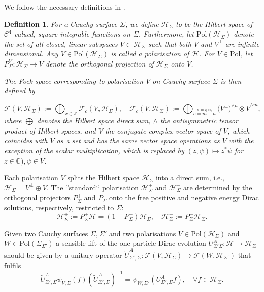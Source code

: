 \documentclass[a4paper,11pt]{article}
\newtheorem{de}{Definition}
\begin{document}
We follow the necessary definitions in \cite{ivp2}.
\begin{de}
For a Cauchy surface \(\Sigma\), we define \(\mathcal{H}_\Sigma\) to be the Hilbert space of \(\mathcal{C}^4\) valued, square integrable functions on \(\Sigma\).
Furthermore, let \(\mathrm{Pol}(\mathcal{H}_\Sigma)\) denote the set of all closed, linear subspaces \(V\subset \mathcal{H}_\Sigma\) such that both
\(V\) and \(V^\perp\) are infinite dimensional. Any \(V\in \mathrm{Pol}(\mathcal{H}_\Sigma)\) is called a polarisation of \(\mathcal{H}\). For \(V\in \mathrm{Pol}\),
let \(P^V_\Sigma:\mathcal{H}_\Sigma\rightarrow V\) denote the orthogonal projection of \(\mathcal{H}_\Sigma\) onto \(V\).

The Fock space corresponding to polarisation \(V\) on Cauchy surface \(\Sigma\) is then defined by 

\begin{equation}
\mathcal{F}(V,\mathcal{H}_\Sigma):=\bigoplus_{c\in\mathbb{Z}}\mathcal{F}_c(V,\mathcal{H}_\Sigma), \quad 
\mathcal{F}_c(V,\mathcal{H}_\Sigma):=\bigoplus_{\overset{n,m\in\mathbb{N}_0}{c=m-n}} \big( V^\perp\big)^{\wedge n} \otimes {\overline{V}}^{\wedge m},
\end{equation}
where \(\bigoplus\) denotes the Hilbert space direct sum, \(\wedge\) the antisymmetric tensor product of Hilbert spaces, and \(\overline{V}\) the conjugate complex vector
space of \(V\), which coincides with \(V\) as a set and has the same vector space operations as \(V\) with the exception of the scalar multiplication, which is 
replaced by \((z,\psi)\mapsto z^*\psi\) for \(z\in\mathbb{C}),\psi\in V\).
\end{de}

Each polarisation \(V\) splits the Hilbert space \(\mathcal{H}_\Sigma\) into a direct sum, i.e., \(\mathcal{H}_\Sigma=V^\perp \oplus V\). The ''standard`` polarisation 
\(\mathcal{H}^+_\Sigma\) and \(\mathcal{H}^-_\Sigma\) are determined by the orthogonal projectors \(P^+_\Sigma\) and \(P^-_\Sigma\) onto the free positive and 
negative energy Dirac solutions, respectively, restricted to \(\Sigma\):
\begin{equation}
\mathcal{H}_\Sigma^+:=P^+_\Sigma \mathcal{H}=(1-P_\Sigma^-)\mathcal{H}_\Sigma, \quad \mathcal{H}^-_\Sigma:=P^-_\Sigma \mathcal{H}_\Sigma.
\end{equation}

Given two Cauchy surfaces \(\Sigma, \Sigma'\) and two polarisations \(V\in \mathrm{Pol}(\mathcal{H}_\Sigma)\) and \(W\in \mathrm{Pol}(\Sigma_{\Sigma'})\)
a sensible lift of the one particle Dirac evolution \(U_{\Sigma'\Sigma}^A:\mathcal{H}\rightarrow \mathcal{H}_{\Sigma}\) should be given by a unitary operator
\(\tilde{U}_{\Sigma',\Sigma}^A:\mathcal{F}(V,\mathcal{H}_\Sigma)\rightarrow \mathcal{F}(W,\mathcal{H}_{\Sigma'})\) that fulfils 
\begin{equation}\label{liftcondition}
\tilde{U}^A_{\Sigma',\Sigma}\psi_{V,\Sigma}(f)(\tilde{U}^A_{\Sigma',\Sigma})^{-1}=\psi_{W,\Sigma'}(U^A_{\Sigma',\Sigma}f),\quad \forall f\in \mathcal{H}_\Sigma.
\end{equation}
\end{document}
